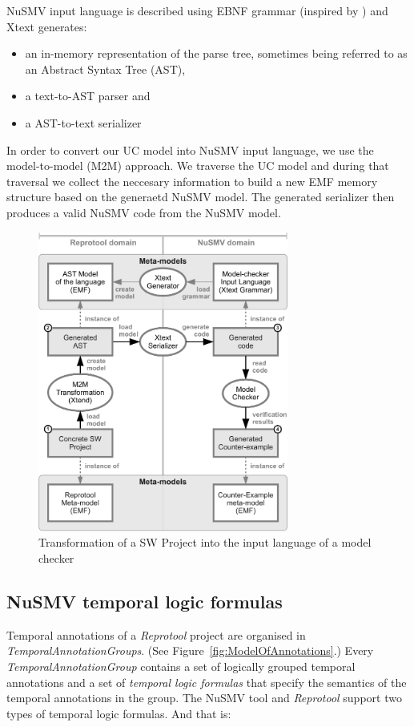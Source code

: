 NuSMV input language is described using EBNF grammar (inspired by \cite{googlecode-nusmv-tools}) and Xtext generates:
\begin{itemize}
  \item an in-memory representation of the parse tree, sometimes being referred to as an Abstract Syntax Tree (AST),
  \item a text-to-AST parser and
  \item a AST-to-text serializer
\end{itemize}

In order to convert our UC model into NuSMV input language, we use the model-to-model (M2M) approach.
We traverse the UC model and during that traversal we collect the neccesary information to build a new EMF memory structure based on the generaetd NuSMV model.
The generated serializer then produces a valid NuSMV code from the NuSMV model.

\begin{figure}[ht]
  \centering
  \includegraphics[height=280pt]{images/XtextWorkflow}
  \caption{Transformation of a SW Project into the input language of a model checker}
  \label{fig:XtextWorkflow}
\end{figure}
\pagebreak

\subsection{NuSMV temporal logic formulas}

Temporal annotations of a \emph{Reprotool} project are organised in \emph{TemporalAnnotationGroups}. (See Figure~\ref{fig:ModelOfAnnotations}.)
Every \emph{TemporalAnnotationGroup} contains a set of logically grouped temporal annotations and a set of \emph{temporal logic formulas}
that specify the semantics of the temporal annotations in the group. The NuSMV tool and \emph{Reprotool} support two types of temporal logic
formulas. And that is:

